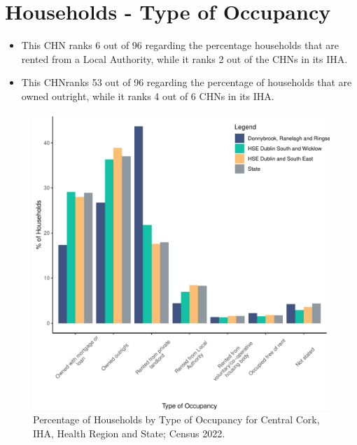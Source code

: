 \documentclass{article}
\begin{document}
\section{Households - Type of Occupancy}\label{sect:Households}
\begin{itemize}
\item This CHN ranks  6 out of 96 regarding the percentage households that are rented from a Local Authority, while it ranks  2 out of the CHNs in its IHA. 
\item This CHNranks  53 out of 96 regarding the percentage of households that are owned outright, while it ranks   4 out of 6 CHNs in its IHA.
\end{itemize}
\begin{figure}[H]
	\centering
	\includegraphics[width = 140mm]{../figures/HouseholdsED.pdf}
	\caption{Percentage of Households by Type of Occupancy for Central Cork, IHA, Health Region and State; Census 2022.}
	\label{fig:vbnv}
	\end{figure}
\end{document}
